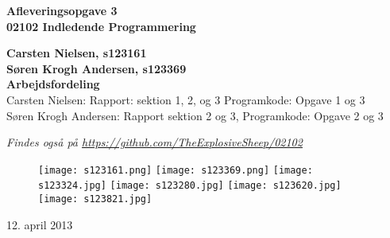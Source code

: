 \thispagestyle{empty} %
\begin{center}
\textbf{\Huge {Afleveringsopgave 3}\\ \vspace{1cm}
\huge{02102 Indledende Programmering}}
\end{center}
\vspace{1cm}
\begin{center}
\Large{\textbf{Carsten Nielsen, s123161 \\ Søren Krogh Andersen, s123369}} \\
\vspace{1cm}
\Large{\textbf{Arbejdsfordeling}} \\
Carsten Nielsen: Rapport: sektion 1, 2, og 3 Programkode: Opgave 1 og 3 \\
Søren Krogh Andersen: Rapport sektion 2 og 3, Programkode: Opgave 2 og 3

\emph{Findes også på \url{https://github.com/TheExplosiveSheep/02102}}
\end{center}
\vspace{6cm}
\begin{figure}[h]
\hfill
\texttt{[image: s123161.png]}%
\texttt{[image: s123369.png]}%
\texttt{[image: s123324.jpg]}%
\texttt{[image: s123280.jpg]}%
\texttt{[image: s123620.jpg]}%
\texttt{[image: s123821.jpg]}%
\end{figure}
12. april 2013

\thispagestyle{empty}
\newpage

